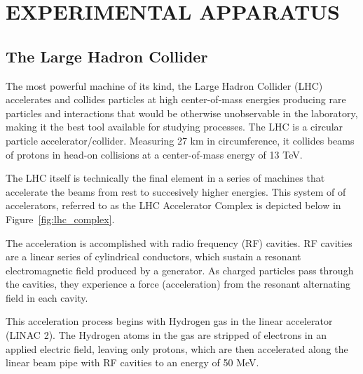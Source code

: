 %
%
%
%
%
%
%
%
%
%


%
%

\chapter{EXPERIMENTAL APPARATUS}

\section{The Large Hadron Collider}
The most powerful machine of its kind, the Large Hadron
Collider (LHC) accelerates and collides particles
at high center-of-mass energies producing rare
particles and interactions that would be otherwise unobservable
in the laboratory, making it the best tool available for studying \tth
processes. The LHC is a circular particle accelerator/collider. Measuring 27 km
in circumference, it collides beams of protons in head-on collisions       
at a center-of-mass energy of 13 TeV.

The LHC itself is technically the final element in a series of machines
that accelerate the beams from rest to succesively higher energies. This system of
of accelerators, referred to as the LHC Accelerator Complex is depicted below in
Figure~\ref{fig:lhc_complex}.

The acceleration is accomplished with radio frequency
(RF) cavities. RF cavities are a linear series of cylindrical conductors,
which sustain a resonant electromagnetic field produced by a generator. As 
charged particles pass through the cavities, they experience a force
(acceleration) from the resonant alternating field in each cavity.

This acceleration process begins with Hydrogen gas in the linear accelerator
(LINAC 2). The Hydrogen atoms in the gas are stripped of electrons
in an applied electric field, leaving only protons, which are then accelerated
along the linear beam pipe with RF cavities to an energy of 50 MeV. 

